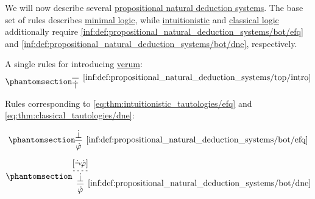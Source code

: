 \begin{definition}\label{def:propositional_natural_deduction_systems}
  We will now describe several \hyperref[def:abstract_natural_deduction_system]{propositional natural deduction systems}. The base set of rules describes \hyperref[con:minimal_logic]{minimal logic}, while \hyperref[con:intuitionistic_logic]{intuitionistic} and \hyperref[con:classical_logic]{classical logic} additionally require \ref{inf:def:propositional_natural_deduction_systems/bot/efq} and \ref{inf:def:propositional_natural_deduction_systems/bot/dne}, respectively.

  \begin{thmenum}
    \mimprovised A single rules for introducing \hyperref[def:propositional_alphabet/constants/verum]{verum}:
    \begin{equation*}\taglabel[\ensuremath{ \top_+ }]{inf:def:propositional_natural_deduction_systems/top/intro}
      \begin{prooftree}
        \infer0[\ref{inf:def:propositional_natural_deduction_systems/top/intro}]{ \syntop }
      \end{prooftree}
    \end{equation*}

     Rules corresponding to \eqref{eq:thm:intuitionistic_tautologies/efq} and \eqref{eq:thm:classical_tautologies/dne}:
    \begin{paracol}{2}
      \ParacolAlignmentHack
      \begin{equation*}\taglabel[\logic{EFQ}]{inf:def:propositional_natural_deduction_systems/bot/efq}
        \begin{prooftree}
          \hypo{ \synbot }
          \infer1[\ref{inf:def:propositional_natural_deduction_systems/bot/efq}]{ \syn\varphi }
        \end{prooftree}
      \end{equation*}

      \switchcolumn

      \ParacolAlignmentHack
      \begin{equation*}\taglabel[\logic{DNE}]{inf:def:propositional_natural_deduction_systems/bot/dne}
        \begin{prooftree}
          \hypo{ [\synneg \syn\varphi] }
          \infer[dashed]1{ \synbot }
          \infer1[\ref{inf:def:propositional_natural_deduction_systems/bot/dne}]{ \syn\varphi }
        \end{prooftree}
      \end{equation*}


\end{paracol}
\end{thmenum}
\end{definition}
